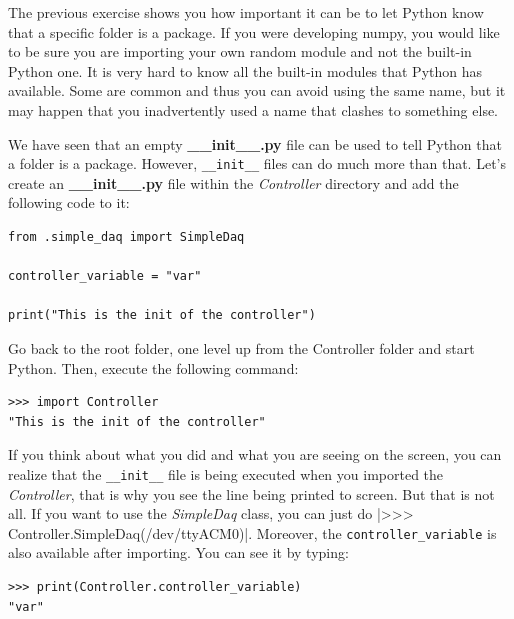 
The previous exercise shows you how important it can be to let Python know that a specific folder is a package. If you were developing numpy, you would like to be sure you are importing your own random module and not the built-in Python one. It is very hard to know all the built-in modules that Python has available. Some are common and thus you can avoid using the same name, but it may happen that you inadvertently used a name that clashes to something else. 

We have seen that an empty \textbf{\_\_init\_\_.py} file can be used to tell Python that a folder is a package. However, \texttt{\_\_init\_\_} files can do much more than that. Let's create an \textbf{\_\_init\_\_.py} file within the \emph{Controller} directory and add the following code to it:

\begin{verbatim}
from .simple_daq import SimpleDaq

controller_variable = "var"

print("This is the init of the controller")
\end{verbatim}

Go back to the root folder, one level up from the Controller folder and start Python. Then, execute the following command:

\begin{verbatim}
>>> import Controller
"This is the init of the controller"
\end{verbatim}

If you think about what you did and what you are seeing on the screen, you can realize that the \texttt{\_\_init\_\_} file is being executed when you imported the \emph{Controller}, that is why you see the line being printed to screen. But that is not all. If you want to use the \emph{SimpleDaq}
class, you can just do |>>> Controller.SimpleDaq(/dev/ttyACM0)|. Moreover, the \texttt{controller_variable} is also available after importing. You can see it by typing:

\begin{verbatim}
>>> print(Controller.controller_variable)
"var"
\end{verbatim}

